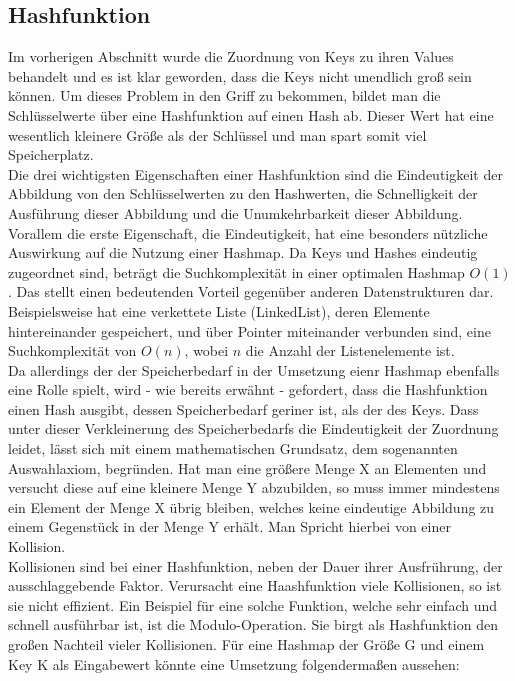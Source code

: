 \documentclass[11pt,a4paper]{article}
\begin{document}
\subsection{Hashfunktion}

Im vorherigen Abschnitt wurde die Zuordnung von Keys zu ihren Values behandelt und es ist klar geworden, dass die Keys nicht unendlich groß sein können.
Um dieses Problem in den Griff zu bekommen, bildet man die Schlüsselwerte über eine Hashfunktion auf einen Hash ab.
Dieser Wert hat eine wesentlich kleinere Größe als der Schlüssel und man spart somit viel Speicherplatz.\\
Die drei wichtigsten Eigenschaften einer Hashfunktion sind die Eindeutigkeit der Abbildung von den Schlüsselwerten zu den Hashwerten, die Schnelligkeit 
der Ausführung dieser Abbildung und die Unumkehrbarkeit dieser Abbildung.\\
Vorallem die erste Eigenschaft, die Eindeutigkeit, hat eine besonders nützliche Auswirkung auf die Nutzung einer Hashmap. Da Keys und Hashes eindeutig zugeordnet sind,
beträgt die Suchkomplexität in einer optimalen Hashmap $O(1)$. Das stellt einen bedeutenden Vorteil gegenüber anderen Datenstrukturen dar. Beispielsweise hat eine 
verkettete Liste (LinkedList), deren Elemente hintereinander gespeichert, und über Pointer miteinander verbunden sind, eine Suchkomplexität von $O(n)$, wobei $n$ die Anzahl der Listenelemente ist.\\
Da allerdings der der Speicherbedarf in der Umsetzung eienr Hashmap ebenfalls eine Rolle spielt, wird - wie bereits erwähnt - gefordert, dass die Hashfunktion einen Hash 
ausgibt, dessen Speicherbedarf geriner ist, als der des Keys. Dass unter dieser Verkleinerung des Speicherbedarfs die Eindeutigkeit der Zuordnung leidet, lässt sich 
mit einem mathematischen Grundsatz, dem sogenannten Auswahlaxiom, begründen. Hat man eine größere Menge X an Elementen und versucht diese auf eine kleinere Menge Y abzubilden, so muss immer
mindestens ein Element der Menge X übrig bleiben, welches keine eindeutige Abbildung zu einem Gegenstück in der Menge Y erhält.
Man Spricht hierbei von einer Kollision.\\
Kollisionen sind bei einer Hashfunktion, neben der Dauer ihrer Ausfrührung, der ausschlaggebende Faktor. Verursacht eine Haashfunktion viele Kollisionen,
so ist sie nicht effizient. Ein Beispiel für eine solche Funktion, welche sehr einfach und schnell ausführbar ist, ist die Modulo-Operation.
Sie birgt als Hashfunktion den großen Nachteil vieler Kollisionen. Für eine Hashmap der Größe G und einem Key K als Eingabewert könnte eine Umsetzung folgendermaßen aussehen:
\end{document}
